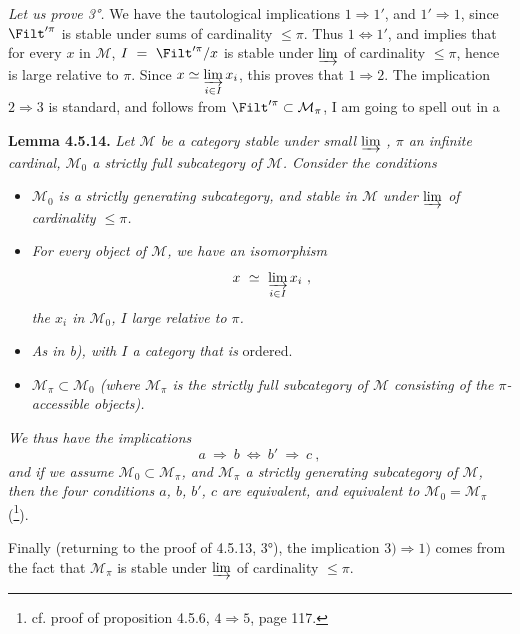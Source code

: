 \textit{Let us prove 3°.} We have the tautological implications $1 \Longrightarrow 1'$, and $1' \Longrightarrow 1$, since $\Filt'^{\pi}$ is stable under sums of cardinality $\leqslant \pi$. Thus $1 \Longleftrightarrow 1'$, and implies that for every $x$ in $\mathcal{M}$,
$I \ = \ \Filt'^{\pi}/x$ is stable under $\varinjlim$ of cardinality $\leqslant \pi$, hence is large relative to $\pi$. Since $x \simeq \varinjlim\limits_{i\in I} x_i$, this proves that $1 \Longrightarrow 2$. The implication $2 \Longrightarrow 3$ is standard, and follows from $\Filt'^{\pi} \subset \mathcal{M}_{\pi}$, I am going to spell out in a

\textbf{Lemma 4.5.14.} \textit{Let $\mathcal{M}$ be a category stable under small} $\varinjlim$ \textit{, $\pi$ an infinite cardinal, $\mathcal{M}_0$ a strictly full subcategory of $\mathcal{M}$. Consider the conditions}
\begin{itemize}
\item[\textit{a)}] \textit{$\mathcal{M}_0$ is a strictly generating subcategory, and stable in $\mathcal{M}$ under} $\varinjlim$ \textit{of cardinality $\leqslant \pi$.}
\item[\textit{b)}] \textit{For every object of $\mathcal{M}$, we have an isomorphism}
\[ x \ \simeq \ \varinjlim_{i\in I} x_i \ , \]
\textit{the $x_i$ in $\mathcal{M}_0$, $I$ large relative to $\pi$.}

\item[\textit{b$'$)}] \textit{As in b), with $I$ a category that is} ordered.
\item[\textit{c)}] \textit{$\mathcal{M}_{\pi} \subset \mathcal{M}_0$ (where $\mathcal{M}_{\pi}$ is the strictly full subcategory of $\mathcal{M}$ consisting of the $\pi$-accessible objects).}
\end{itemize}
\textit{We thus have the implications}
\[ a \ \Longrightarrow \ b \ \Longleftrightarrow \ b' \ \Longrightarrow \ c \ , \]
\textit{and if we assume $\mathcal{M}_0 \subset \mathcal{M}_{\pi}$, and $\mathcal{M}_{\pi}$ a strictly generating subcategory of $\mathcal{M}$, then the four conditions $a$, $b$, $b'$, $c$ are equivalent, and equivalent to $\mathcal{M}_0 = \mathcal{M}_{\pi}$} (\footnote{cf. proof of proposition 4.5.6, $4 \Longrightarrow 5$, page 117.}).

Finally (returning to the proof of 4.5.13, 3°), the implication $3) \Longrightarrow 1)$ comes from the fact that $\mathcal{M}_{\pi}$ is stable under $\varinjlim$ of cardinality $\leqslant \pi$.

